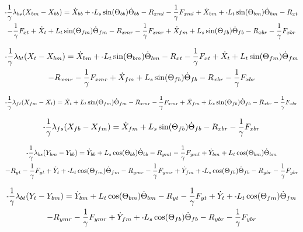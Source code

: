\documentclass[11pt, landscape]{article}
\newcommand{\mn}{\scalebox{0.7}[1.0]{-}}
\begin{document}
\begin{multline}
\mn\frac{1}{\gamma}\lambda_{bs}(X_{bm} - X_{bb}) =
\dot{X}_{bb} + \mn L_{s}\sin(\Theta_{bb})\dot{\Theta}_{bb} - R_{xml} - \frac{1}{\gamma}F_{xml} + \dot{X}_{bm} + \mn L_{t}\sin(\Theta_{bm})\dot{\Theta}_{bm} - R_{xt } \\
- \frac{1}{\gamma}F_{xt } + \dot{X}_{t } + L_{t}\sin(\Theta_{fm})\dot{\Theta}_{fm} - R_{xmr}
-\frac{1}{\gamma}F_{xmr} + \dot{X}_{fm} + L_{s}\sin(\Theta_{fb})\dot{\Theta}_{fb} - R_{xbr} - \frac{1}{\gamma}F_{xbr}
\label{eq:Ax}
\end{multline}%

\begin{multline}
\mn\frac{1}{\gamma}\lambda_{bt}(X_{t } - X_{bm}) =
\dot{X}_{bm} + \mn L_{t}\sin(\Theta_{bm})\dot{\Theta}_{bm} - R_{xt } - \frac{1}{\gamma}F_{xt } + \dot{X}_{t } + L_{t}\sin(\Theta_{fm})\dot{\Theta}_{fm} \\
- R_{xmr} - \frac{1}{\gamma}F_{xmr} + \dot{X}_{fm} + L_{s}\sin(\Theta_{fb})\dot{\Theta}_{fb} - R_{xbr} - \frac{1}{\gamma}F_{xbr}
\label{eq:Bx}
\end{multline}%

\begin{equation}
\mn\frac{1}{\gamma}\lambda_{ft}(X_{fm} - X_{t }) =
\dot{X}_{t } + L_{t}\sin(\Theta_{fm})\dot{\Theta}_{fm} - R_{xmr} - \frac{1}{\gamma}F_{xmr}
+ \dot{X}_{fm} + L_{s}\sin(\Theta_{fb})\dot{\Theta}_{fb} - R_{xbr} - \frac{1}{\gamma}F_{xbr}
\label{eq:Cx}
\end{equation}%

\begin{equation}
\mn\frac{1}{\gamma}\lambda_{fs}(X_{fb} - X_{fm}) = 
\dot{X}_{fm} + L_{s}\sin(\Theta_{fb})\dot{\Theta}_{fb} - R_{xbr} - \frac{1}{\gamma}F_{xbr}
\label{eq:Dx}
\end{equation}%


\begin{multline}
\mn\frac{1}{\gamma}\lambda_{bs}(Y_{bm} - Y_{bb}) =
\dot{Y}_{bb} + L_{s}\cos(\Theta_{bb})\dot{\Theta}_{bb} - R_{yml} - \frac{1}{\gamma}F_{yml} + \dot{Y}_{bm} + L_{t}\cos(\Theta_{bm})\dot{\Theta}_{bm} \\
- R_{yt} - \frac{1}{\gamma}F_{yt } + \dot{Y}_{t } + \mn L_{t}\cos(\Theta_{fm})\dot{\Theta}_{fm} - R_{ymr} - \frac{1}{\gamma}F_{ymr} + \dot{Y}_{fm}
+ \mn L_{s}\cos(\Theta_{fb})\dot{\Theta}_{fb} - R_{ybr} - \frac{1}{\gamma}F_{ybr}
\label{eq:Ay}
\end{multline}%

\begin{multline}
\mn\frac{1}{\gamma}\lambda_{bt}(Y_{t } - Y_{bm}) =
\dot{Y}_{bm} + L_{t}\cos(\Theta_{bm})\dot{\Theta}_{bm} - R_{yt} - \frac{1}{\gamma}F_{yt } + \dot{Y}_{t } + \mn L_{t}\cos(\Theta_{fm})\dot{\Theta}_{fm} \\
- R_{ymr} - \frac{1}{\gamma}F_{ymr} + \dot{Y}_{fm} + \mn L_{s}\cos(\Theta_{fb})\dot{\Theta}_{fb} - R_{ybr} - \frac{1}{\gamma}F_{ybr}
\label{eq:By}
\end{multline}%
\end{document}
